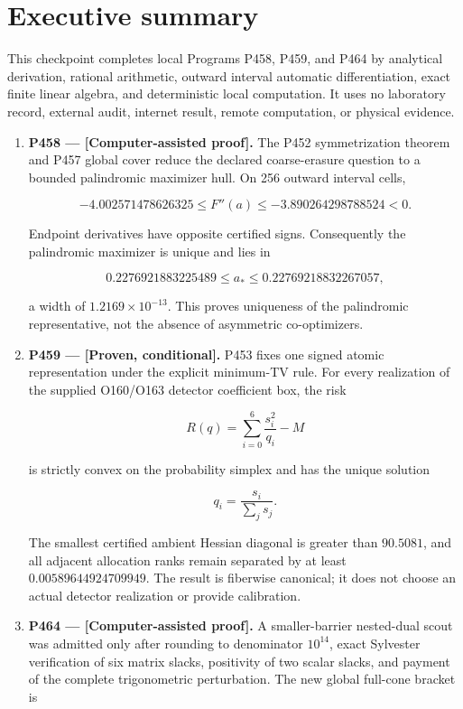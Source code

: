 \documentclass[11pt,a4paper,openany]{report}
\begin{document}
\chapter{Executive summary}

This checkpoint completes local Programs P458, P459, and P464 by analytical derivation, rational arithmetic, outward interval automatic differentiation, exact finite linear algebra, and deterministic local computation. It uses no laboratory record, external audit, internet result, remote computation, or physical evidence.

\begin{enumerate}
\item 
\textbf{P458 --- \textcolor{fingreen}{[Computer-assisted proof]}.} The P452 symmetrization theorem and P457 global cover reduce the declared coarse-erasure question to a bounded palindromic maximizer hull. On 256 outward interval cells,

\[
   -4.002571478626325\le F''(a)\le-3.890264298788524<0.
   \]

Endpoint derivatives have opposite certified signs. Consequently the palindromic maximizer is unique and lies in

\[
   0.2276921883225489\le a_*\le0.22769218832267057,
   \]

a width of \(1.2169\times10^{-13}\). This proves uniqueness of the palindromic representative, not the absence of asymmetric co-optimizers.

\item 
\textbf{P459 --- [Proven, conditional].} P453 fixes one signed atomic representation under the explicit minimum-TV rule. For every realization of the supplied O160/\allowbreak{}O163 detector coefficient box, the risk

\[
   R(q)=\sum_{i=0}^{6}\frac{s_i^2}{q_i}-M
   \]

is strictly convex on the probability simplex and has the unique solution

\[
   q_i=\frac{s_i}{\sum_j s_j}.
   \]

The smallest certified ambient Hessian diagonal is greater than \(90.5081\), and all adjacent allocation ranks remain separated by at least \(0.00589644924709949\). The result is fiberwise canonical; it does not choose an actual detector realization or provide calibration.

\item 
\textbf{P464 --- \textcolor{fingreen}{[Computer-assisted proof]}.} A smaller-barrier nested-dual scout was admitted only after rounding to denominator \(10^{14}\), exact Sylvester verification of six matrix slacks, positivity of two scalar slacks, and payment of the complete trigonometric perturbation. The new global full-cone bracket is


\end{enumerate}
\end{document}
